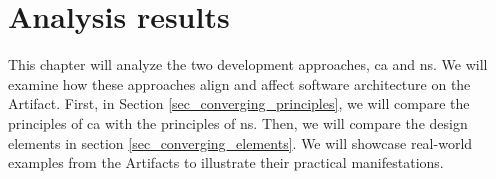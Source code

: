 \chapter{Analysis results} \label{chap_evaluation}

This chapter will analyze the two development approaches, \gls{ca} and \gls{ns}. We will
examine how these approaches align and affect software architecture on the Artifact.
First, in Section \ref{sec_converging_principles}, we will compare the principles of
\gls{ca} with the principles of \gls{ns}. Then, we will compare the design elements in
section \ref{sec_converging_elements}. We will showcase real-world examples from the
Artifacts to illustrate their practical manifestations.






